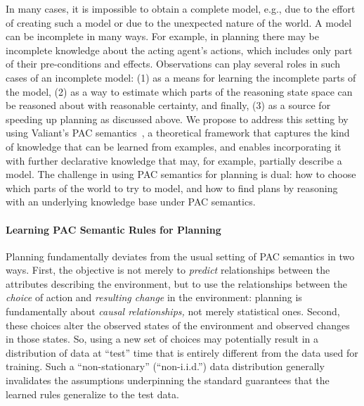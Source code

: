 \documentclass[12pt]{article}
\begin{document}
In many cases, it is impossible to obtain a complete model, e.g., due to the effort of creating such a model or due to the unexpected nature of the world. A model can be incomplete in many ways. For example, in planning there may be incomplete knowledge about the acting agent's actions, which includes only part of their pre-conditions and effects. Observations can play several roles in such cases of an incomplete model: (1) as a means for learning the incomplete parts of the model, (2) as a way to estimate which parts of the reasoning state space can be reasoned about with reasonable certainty, and finally, (3) as a source for speeding up planning as discussed above. 
We propose to address this setting by using Valiant's PAC semantics~\cite{valiant2000robustLogics}, a theoretical framework that captures the kind of knowledge that can be learned from examples, and enables incorporating it with further declarative knowledge that may, for example, partially describe a model. The challenge in  using PAC semantics for planning is dual: how to choose which parts of the world to try to model, and how to find plans by reasoning with an underlying knowledge base under PAC semantics. 









\paragraph{Learning PAC Semantic Rules for Planning}
Planning fundamentally deviates from the usual setting of PAC semantics in two ways. First, the objective is not merely to {\em predict} relationships between the attributes describing the environment, but to use the relationships between the {\em choice} of action and {\em resulting change} in the environment: planning is fundamentally about {\em causal relationships,} not merely statistical ones. Second, these choices alter the observed states of the environment and observed changes in those states. So, using a new set of choices may potentially result in a distribution of data at ``test'' time that is entirely different from the data used for training. Such a ``non-stationary'' (``non-i.i.d.'') data distribution generally invalidates the assumptions underpinning the standard guarantees that the learned rules generalize to the test data.
\end{document}
